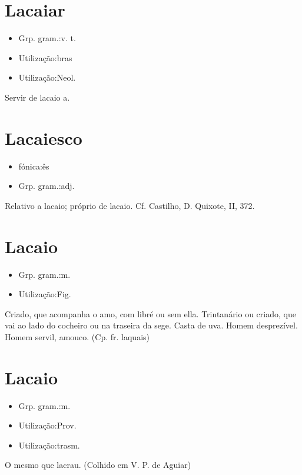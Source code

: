 \section{Lacaiar}
\begin{itemize}
\item {Grp. gram.:v. t.}
\end{itemize}
\begin{itemize}
\item {Utilização:bras}
\end{itemize}
\begin{itemize}
\item {Utilização:Neol.}
\end{itemize}
Servir de lacaio a.
\section{Lacaiesco}
\begin{itemize}
\item {fónica:ês}
\end{itemize}
\begin{itemize}
\item {Grp. gram.:adj.}
\end{itemize}
Relativo a lacaio; próprio de lacaio. Cf. Castilho, \textunderscore D. Quixote\textunderscore , II, 372.
\section{Lacaio}
\begin{itemize}
\item {Grp. gram.:m.}
\end{itemize}
\begin{itemize}
\item {Utilização:Fig.}
\end{itemize}
Criado, que acompanha o amo, com libré ou sem ella.
Trintanário ou criado, que vai ao lado do cocheiro ou na traseira da sege.
Casta de uva.
Homem desprezível.
Homem servil, amouco.
(Cp. fr. \textunderscore laquais\textunderscore )
\section{Lacaio}
\begin{itemize}
\item {Grp. gram.:m.}
\end{itemize}
\begin{itemize}
\item {Utilização:Prov.}
\end{itemize}
\begin{itemize}
\item {Utilização:trasm.}
\end{itemize}
O mesmo que \textunderscore lacrau\textunderscore .
(Colhido em V. P. de Aguiar)

